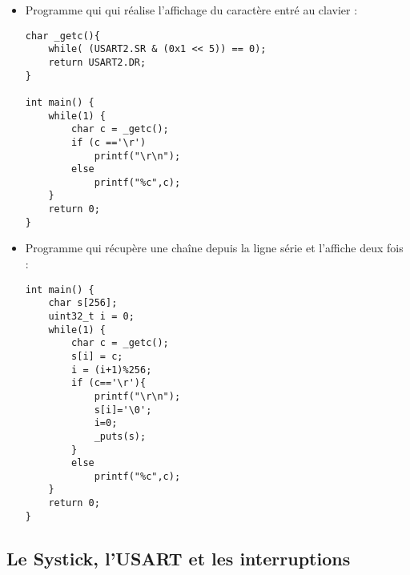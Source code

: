 \documentclass[10pt,a4,french]{article}
\begin{document}
\begin{itemize}
	\item Programme qui qui réalise l'affichage du caractère entré au clavier :
		\begin{lstlisting}
char _getc(){
	while( (USART2.SR & (0x1 << 5)) == 0);
	return USART2.DR;
}

int main() {
	while(1) {
		char c = _getc();
		if (c =='\r')
			printf("\r\n");
		else
			printf("%c",c);
	}
	return 0;
}
		\end{lstlisting}

	\item Programme qui récupère une chaîne depuis la ligne série et l'affiche deux fois :
		\begin{lstlisting}
int main() {
	char s[256];
	uint32_t i = 0;
	while(1) {
		char c = _getc();
		s[i] = c;
		i = (i+1)%256;
		if (c=='\r'){
			printf("\r\n");
			s[i]='\0';
			i=0;
			_puts(s);
		}
		else
			printf("%c",c);
	}
	return 0;
}
		\end{lstlisting}

\end{itemize}

\subsection{Le Systick, l'USART et les interruptions}
\end{document}
